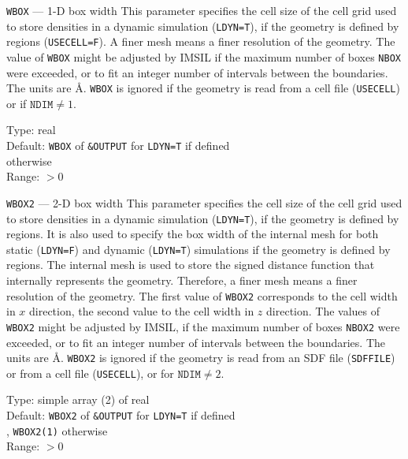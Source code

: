 \begin{keydescription}{\texttt{WBOX} --- 1-D box width}
%
  This parameter specifies the cell size of the cell grid used to store
  densities in a dynamic simulation (\texttt{LDYN=T}), if the geometry is 
  defined by regions (\texttt{USECELL=F}). 
  A finer mesh means a finer resolution of the geometry.
  The value of \texttt{WBOX} might be adjusted by IMSIL if the maximum 
  number of boxes \texttt{NBOX} were exceeded, or to fit an integer 
  number of intervals between the boundaries. 
  The units are \AA. 
  \texttt{WBOX} is ignored if the geometry is read from a cell file 
  (\texttt{USECELL}) or if $\texttt{NDIM} \ne 1$.
  \begin{keytab}
    Type:    \> real \\
    Default: \> \texttt{WBOX} of \texttt{\&OUTPUT} for \texttt{LDYN=T} if 
                defined \\
              otherwise \\
    Range:   \> $> 0$
  \end{keytab}
\end{keydescription}

\begin{keydescription}{\texttt{WBOX2} --- 2-D box width}
%
  This parameter specifies the cell size of the cell grid used to store
  densities in a dynamic simulation (\texttt{LDYN=T}), if the geometry is 
  defined by regions. 
  It is also used to specify the box width of the internal mesh for both
  static (\texttt{LDYN=F}) and dynamic (\texttt{LDYN=T}) simulations if the
  geometry is defined by regions.
  The internal mesh is used to store the signed distance function that
  internally represents the geometry.
  Therefore, a finer mesh means a finer resolution of the geometry.
  The first value of \texttt{WBOX2} corresponds to the cell width in $x$ 
  direction, the second value to the cell width in $z$ 
  direction. 
  The values of \texttt{WBOX2} might be adjusted by IMSIL, if the maximum 
  number of boxes \texttt{NBOX2} were exceeded, or to fit an integer 
  number of intervals between the boundaries. 
  The units are \AA. 
  \texttt{WBOX2} is ignored if the geometry is read from an SDF file 
  (\texttt{SDFFILE}) or from a cell file (\texttt{USECELL}), or for 
  $\texttt{NDIM} \ne 2$.
  \begin{keytab}
    Type:    \> simple array (2) of real \\
    Default: \> \texttt{WBOX2} of \texttt{\&OUTPUT} for \texttt{LDYN=T} if
                defined \\
             , \texttt{WBOX2(1)} otherwise \\
    Range:   \> $> 0$
  \end{keytab}
\end{keydescription}

